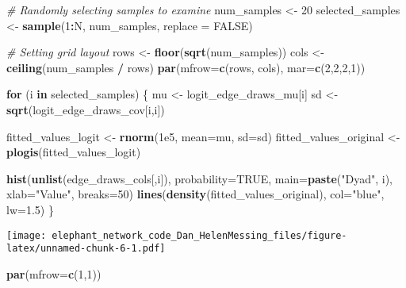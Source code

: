 \documentclass[
]{article}
\newenvironment{Shaded}{\begin{snugshade}}{\end{snugshade}}
\newcommand{\AttributeTok}[1]{\textcolor[rgb]{0.13,0.29,0.53}{#1}}
\newcommand{\CommentTok}[1]{\textcolor[rgb]{0.56,0.35,0.01}{\textit{#1}}}
\newcommand{\ConstantTok}[1]{\textcolor[rgb]{0.56,0.35,0.01}{#1}}
\newcommand{\ControlFlowTok}[1]{\textcolor[rgb]{0.13,0.29,0.53}{\textbf{#1}}}
\newcommand{\DecValTok}[1]{\textcolor[rgb]{0.00,0.00,0.81}{#1}}
\newcommand{\FloatTok}[1]{\textcolor[rgb]{0.00,0.00,0.81}{#1}}
\newcommand{\FunctionTok}[1]{\textcolor[rgb]{0.13,0.29,0.53}{\textbf{#1}}}
\newcommand{\NormalTok}[1]{#1}
\newcommand{\OtherTok}[1]{\textcolor[rgb]{0.56,0.35,0.01}{#1}}
\newcommand{\SpecialCharTok}[1]{\textcolor[rgb]{0.81,0.36,0.00}{\textbf{#1}}}
\newcommand{\StringTok}[1]{\textcolor[rgb]{0.31,0.60,0.02}{#1}}
\begin{document}
\begin{Shaded}
\begin{Highlighting}[]
\CommentTok{\# Randomly selecting samples to examine}
\NormalTok{num\_samples }\OtherTok{\textless{}{-}} \DecValTok{20}
\NormalTok{selected\_samples }\OtherTok{\textless{}{-}} \FunctionTok{sample}\NormalTok{(}\DecValTok{1}\SpecialCharTok{:}\NormalTok{N, num\_samples, }\AttributeTok{replace =} \ConstantTok{FALSE}\NormalTok{)}

\CommentTok{\# Setting grid layout}
\NormalTok{rows }\OtherTok{\textless{}{-}} \FunctionTok{floor}\NormalTok{(}\FunctionTok{sqrt}\NormalTok{(num\_samples))}
\NormalTok{cols }\OtherTok{\textless{}{-}} \FunctionTok{ceiling}\NormalTok{(num\_samples }\SpecialCharTok{/}\NormalTok{ rows)}
\FunctionTok{par}\NormalTok{(}\AttributeTok{mfrow=}\FunctionTok{c}\NormalTok{(rows, cols), }\AttributeTok{mar=}\FunctionTok{c}\NormalTok{(}\DecValTok{2}\NormalTok{,}\DecValTok{2}\NormalTok{,}\DecValTok{2}\NormalTok{,}\DecValTok{1}\NormalTok{))}

\ControlFlowTok{for}\NormalTok{ (i }\ControlFlowTok{in}\NormalTok{ selected\_samples) \{}
\NormalTok{  mu }\OtherTok{\textless{}{-}}\NormalTok{ logit\_edge\_draws\_mu[i]}
\NormalTok{  sd }\OtherTok{\textless{}{-}} \FunctionTok{sqrt}\NormalTok{(logit\_edge\_draws\_cov[i,i])}

\NormalTok{  fitted\_values\_logit }\OtherTok{\textless{}{-}} \FunctionTok{rnorm}\NormalTok{(}\FloatTok{1e5}\NormalTok{, }\AttributeTok{mean=}\NormalTok{mu, }\AttributeTok{sd=}\NormalTok{sd)}
\NormalTok{  fitted\_values\_original }\OtherTok{\textless{}{-}} \FunctionTok{plogis}\NormalTok{(fitted\_values\_logit)}

  \FunctionTok{hist}\NormalTok{(}\FunctionTok{unlist}\NormalTok{(edge\_draws\_cols[,i]), }\AttributeTok{probability=}\ConstantTok{TRUE}\NormalTok{, }\AttributeTok{main=}\FunctionTok{paste}\NormalTok{(}\StringTok{"Dyad"}\NormalTok{, i), }\AttributeTok{xlab=}\StringTok{"Value"}\NormalTok{, }\AttributeTok{breaks=}\DecValTok{50}\NormalTok{)}
  \FunctionTok{lines}\NormalTok{(}\FunctionTok{density}\NormalTok{(fitted\_values\_original), }\AttributeTok{col=}\StringTok{"blue"}\NormalTok{, }\AttributeTok{lw=}\FloatTok{1.5}\NormalTok{)}
\NormalTok{\}}
\end{Highlighting}
\end{Shaded}

\texttt{[image: elephant\_network\_code\_Dan\_HelenMessing\_files/figure-latex/unnamed-chunk-6-1.pdf]}

\begin{Shaded}
\begin{Highlighting}[]
\FunctionTok{par}\NormalTok{(}\AttributeTok{mfrow=}\FunctionTok{c}\NormalTok{(}\DecValTok{1}\NormalTok{,}\DecValTok{1}\NormalTok{))}
\end{Highlighting}
\end{Shaded}
\end{document}
